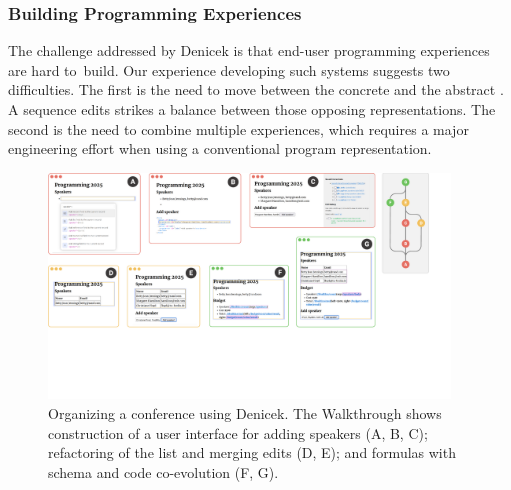\documentclass[sigconf]{acmart}
\newcommand{\diff}[1]{{#1}}
\newcommand{\note}[1]{}
\begin{document}
\note{Added report of our experience with what makes EUP systems hard to build.}
\subsubsection*{Building Programming Experiences}
\diff{
The challenge addressed by Denicek is that end-user programming experiences are hard to~build.
Our experience developing such systems \cite{petricek-2019-histogram,petricek-2022-thegamma,
jakubovic-2022-ladder,edwards-2005-subtext,edwards-2004-example} suggests two difficulties.
The first is the need to move between the concrete and the abstract \cite{jakubovic-2023-techdims}.
A sequence edits strikes a balance between those opposing representations.
The second is the need to combine multiple experiences, which requires
a major engineering effort when using a conventional program representation.}




\begin{figure}[t]
\includegraphics[width=0.95\textwidth,clip,trim=0cm 6cm 1.7cm 0cm]{fig/walkthrough.pdf}
\caption{Organizing a conference using Denicek. The Walkthrough shows construction of a user
  interface for adding speakers (A, B, C); refactoring of the list and merging edits (D, E); and
  formulas with schema and code co-evolution (F, G).}
\label{fig:walkthrough}
\end{figure}
\end{document}
